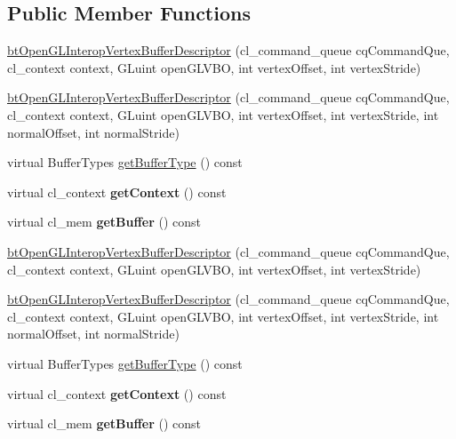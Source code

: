 \subsection*{Public Member Functions}
\begin{DoxyCompactItemize}
\item 
\hyperlink{classbtOpenGLInteropVertexBufferDescriptor_aaa1a32a4c4589836a19b8965f8c8a828}{bt\+Open\+G\+L\+Interop\+Vertex\+Buffer\+Descriptor} (cl\+\_\+command\+\_\+queue cq\+Command\+Que, cl\+\_\+context context, G\+Luint open\+G\+L\+V\+BO, int vertex\+Offset, int vertex\+Stride)
\item 
\hyperlink{classbtOpenGLInteropVertexBufferDescriptor_a427f8c5e77e3a8a4334c3a63d97c17ba}{bt\+Open\+G\+L\+Interop\+Vertex\+Buffer\+Descriptor} (cl\+\_\+command\+\_\+queue cq\+Command\+Que, cl\+\_\+context context, G\+Luint open\+G\+L\+V\+BO, int vertex\+Offset, int vertex\+Stride, int normal\+Offset, int normal\+Stride)
\item 
virtual Buffer\+Types \hyperlink{classbtOpenGLInteropVertexBufferDescriptor_ad53252ccc0b8f46e1b0af4d8ba1cd445}{get\+Buffer\+Type} () const
\item 
\mbox{\label{classbtOpenGLInteropVertexBufferDescriptor_a665ed57623a22287f376939489b389f2}} 
virtual cl\+\_\+context {\bfseries get\+Context} () const
\item 
\mbox{\label{classbtOpenGLInteropVertexBufferDescriptor_a9dd69ccfed6e8f6207dc3815422977e7}} 
virtual cl\+\_\+mem {\bfseries get\+Buffer} () const
\item 
\hyperlink{classbtOpenGLInteropVertexBufferDescriptor_aaa1a32a4c4589836a19b8965f8c8a828}{bt\+Open\+G\+L\+Interop\+Vertex\+Buffer\+Descriptor} (cl\+\_\+command\+\_\+queue cq\+Command\+Que, cl\+\_\+context context, G\+Luint open\+G\+L\+V\+BO, int vertex\+Offset, int vertex\+Stride)
\item 
\hyperlink{classbtOpenGLInteropVertexBufferDescriptor_a427f8c5e77e3a8a4334c3a63d97c17ba}{bt\+Open\+G\+L\+Interop\+Vertex\+Buffer\+Descriptor} (cl\+\_\+command\+\_\+queue cq\+Command\+Que, cl\+\_\+context context, G\+Luint open\+G\+L\+V\+BO, int vertex\+Offset, int vertex\+Stride, int normal\+Offset, int normal\+Stride)
\item 
virtual Buffer\+Types \hyperlink{classbtOpenGLInteropVertexBufferDescriptor_ad53252ccc0b8f46e1b0af4d8ba1cd445}{get\+Buffer\+Type} () const
\item 
\mbox{\label{classbtOpenGLInteropVertexBufferDescriptor_a665ed57623a22287f376939489b389f2}} 
virtual cl\+\_\+context {\bfseries get\+Context} () const
\item 
\mbox{\label{classbtOpenGLInteropVertexBufferDescriptor_a9dd69ccfed6e8f6207dc3815422977e7}} 
virtual cl\+\_\+mem {\bfseries get\+Buffer} () const
\end{DoxyCompactItemize}
